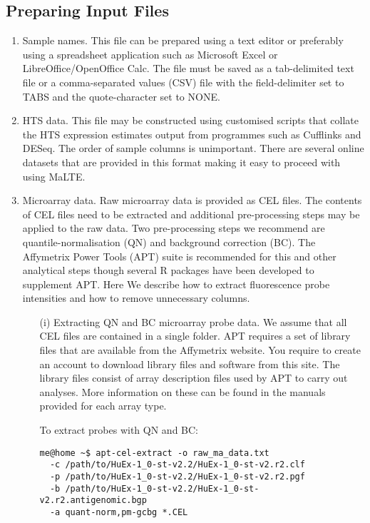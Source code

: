 \documentclass[a4paper,12pt]{article}
\begin{document}
\subsection{Preparing Input Files}
\begin{enumerate}
\item Sample names. This file can be prepared using a text editor or preferably using a spreadsheet application such as Microsoft Excel or LibreOffice/OpenOffice Calc. The file must be saved as a tab-delimited text file or a comma-separated values (CSV) file with the field-delimiter set to TABS and the quote-character set to NONE.

\item HTS data. This file may be constructed using customised scripts that collate the HTS expression estimates output from programmes such as Cufflinks and DESeq. The order of sample columns is unimportant. There are several online datasets that are provided in this format making it easy to proceed with using MaLTE.

\item Microarray data. Raw microarray data is provided as CEL files. The contents of CEL files need to be extracted and additional pre-processing steps may be applied to the raw data. Two pre-processing steps we recommend are quantile-normalisation (QN) and background correction (BC). The Affymetrix Power Tools (APT) suite is recommended for this and other analytical steps though several R packages have been developed to supplement APT.  Here We describe how to extract fluorescence probe intensities and how to remove unnecessary columns.

\begin{enumerate}
\item[(i)] Extracting QN and BC microarray probe data. We assume that all CEL files are contained in a single folder. APT requires a set of library files that are available from the Affymetrix website. You require to create an account to download library files and software from this site. The library files consist of array description files used by APT to carry out analyses. More information on these can be found in the manuals provided for each array type. 

To extract probes with QN and BC:
\begin{verbatim}
me@home ~$ apt-cel-extract -o raw_ma_data.txt 
  -c /path/to/HuEx-1_0-st-v2.2/HuEx-1_0-st-v2.r2.clf 
  -p /path/to/HuEx-1_0-st-v2.2/HuEx-1_0-st-v2.r2.pgf 
  -b /path/to/HuEx-1_0-st-v2.2/HuEx-1_0-st-v2.r2.antigenomic.bgp 
  -a quant-norm,pm-gcbg *.CEL
\end{verbatim}


\end{enumerate}
\end{enumerate}
\end{document}
